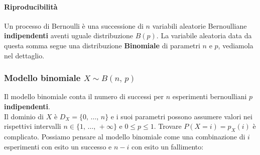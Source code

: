 \paragraph{Riproducibilità}
Un processo di Bernoulli è una successione di $n$ variabili aleatorie Bernoulliane \textbf{indipendenti} aventi uguale distribuzione $B{(p)}$. La variabile aleatoria data da questa somma segue una distribuzione \textbf{Binomiale} di parametri $n$ e $p$, vediamola nel dettaglio.

\subsubsection{Modello binomiale $X \sim B{(n,\,p)}$}
Il modello binomiale conta il numero di successi per $n$ esperimenti bernoulliani $p$ \textbf{indipendenti}.\\
Il dominio di $X$ è $D_X = \{ 0, \, \dots, \, n \}$ e i suoi parametri possono assumere valori nei rispettivi intervalli $n \in \{1, \, \dots, \, +\infty\}$ e $0 \leq p \leq 1$.
Trovare $P(X=i)=p_X(i)$ è complicato. Possiamo pensare al modello binomiale come una combinazione di $i$ esperimenti con esito un successo e $n-i$ con esito un fallimento:

\begin{figure}[h]
\vspace{\abovedisplayskip}
\centering
{}
\end{figure}

